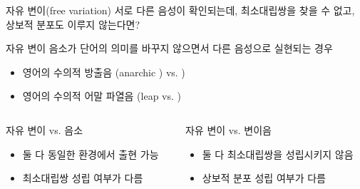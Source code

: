 \documentclass[11pt, aspectratio=169]{beamer}
\newcommand{\textds}[1]{{\ipafont #1}}
\begin{document}
\begin{frame}[t]{자유 변이(free variation)}
    서로 다른 음성이 확인되는데, 최소대립쌍을 찾을 수 없고, 상보적 분포도 이루지 않는다면?
    \begin{block}{자유 변이}
        음소가 단어의 의미를 바꾸지 않으면서 다른 음성으로 실현되는 경우
    \end{block}
    \begin{itemize}
        \item 영어의 수의적 방출음 \textds{[k’]} (anarchic \textds{[ænɑːʳkɪk]}) vs. \textds{[ænɑːʳk’ɪk]})
        \item 영어의 수의적 어말 파열음 \textds{[p̚]} (leap \textds{[lip]} vs. \textds{[lip̚]})
    \end{itemize}
    \begin{columns}
        \begin{column}{0.46\textwidth}
            \begin{block}{자유 변이 vs. 음소}
                \begin{itemize}
                    \item 둘 다 동일한 환경에서 출현 가능
                    \item 최소대립쌍 성립 여부가 다름
                \end{itemize}
            \end{block}
        \end{column}
        \begin{column}{0.47\textwidth}
            \begin{block}{자유 변이 vs. 변이음}
                \begin{itemize}
                    \item 둘 다 최소대립쌍을 성립시키지 않음
                    \item 상보적 분포 성립 여부가 다름
                \end{itemize}
            \end{block}
        \end{column}
    \end{columns}
\end{frame}
\end{document}
